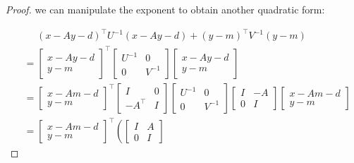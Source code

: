 \begin{proof}
    we can manipulate the exponent to obtain another quadratic form:

    \begin{align}
        &\phantom{=}
        (x - Ay - d)^\intercal U^{-1} (x - Ay - d) + (y - m)^\intercal V^{-1} (y - m) 
        \nonumber \\
        &=
        \begin{bmatrix}
            x - Ay - d \\
            y - m
        \end{bmatrix}^\intercal
        \begin{bmatrix}
            U^{-1} & 0 \\
            0 & V^{-1}
        \end{bmatrix}
        \begin{bmatrix}
            x - Ay - d \\
            y - m
        \end{bmatrix}
        \nonumber \\
        &=
        \begin{bmatrix}
            x - Am - d \\
            y - m
        \end{bmatrix}^\intercal
        \begin{bmatrix}
            I & 0 \\
            -A^\intercal & I
        \end{bmatrix}
        \begin{bmatrix}
            U^{-1} & 0 \\
            0 & V^{-1}
        \end{bmatrix}
        \begin{bmatrix}
            I & -A \\
            0 & I
        \end{bmatrix}
        \begin{bmatrix}
            x - Am - d \\
            y - m
        \end{bmatrix}
        \nonumber \\
        &=
        \begin{bmatrix}
            x - Am - d \\
            y - m
        \end{bmatrix}^\intercal
        \left(
        \begin{bmatrix}
            I & A \\
            0 & I
        \end{bmatrix}

\end{align}
\end{proof}

